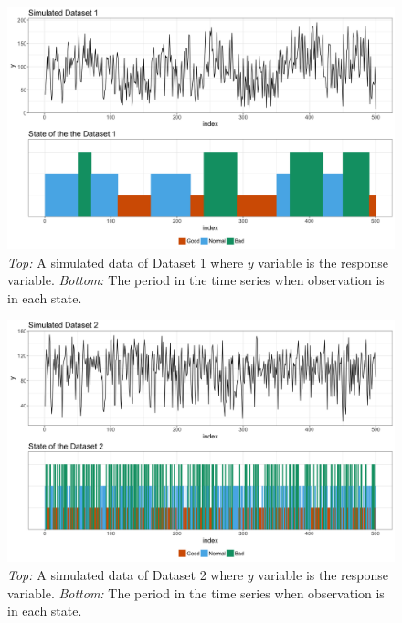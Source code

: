 \begin{figure}[H]
\begin{centering}
\includegraphics[scale=0.35]{picture/sim1}
\par\end{centering}
\caption{\emph{Top:} A simulated data of Dataset 1 where $y$ variable is the
response variable. \emph{Bottom:} The period in the time series when
observation is in each state.}
\label{sim_data}
\end{figure}

\begin{figure}[H]
\begin{centering}
\includegraphics[scale=0.35]{picture/sim2}
\par\end{centering}
\caption{\emph{Top:} A simulated data of Dataset 2 where $y$ variable is the
response variable. \emph{Bottom:} The period in the time series when
observation is in each state.}
\label{sim_data2}
\end{figure}


